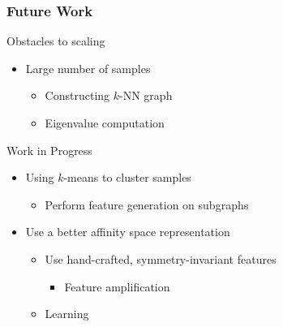 \begin{frame}
\frametitle{Future Work} 
Obstacles to scaling
    \begin{itemize}
    \item Large number of samples
            \begin{itemize}
            \item Constructing $k$-NN graph
            \item Eigenvalue computation
            \end{itemize} 
    \end{itemize} 

Work in Progress
    \begin{itemize}
    \item Using $k$-means to cluster samples
            \begin{itemize}
            \item Perform feature generation on subgraphs
            \end{itemize}
    \item Use a better affinity space representation
            \begin{itemize}
            \item Use hand-crafted, symmetry-invariant features
                \begin{itemize}
                \item Feature amplification
                \end{itemize}
            \item Learning
            \end{itemize}
    \end{itemize}
\end{frame}
